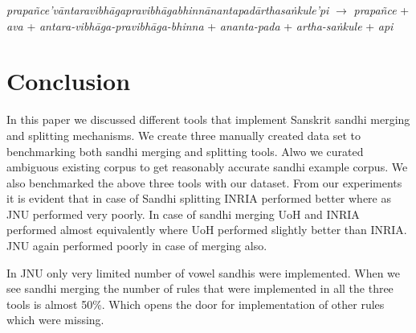 \documentclass[11pt]{article}
\begin{document}
\textit{prapa\~{n}ce'v\={a}ntaravibh\={a}gapravibh\={a}gabhinn\={a}nantapad\={a}rthasa\.{n}kule'pi} $\rightarrow$ \textit{prapa\~{n}ce} + \textit{ava} + \textit{antara-vibh\={a}ga-pravibh\={a}ga-bhinna} + \textit{ananta-pada} + \textit{artha-sa\.{n}kule} + \textit{api}


\section{Conclusion}
In this paper we discussed different tools that implement Sanskrit sandhi merging and splitting mechanisms. We create three manually created data set to benchmarking both sandhi merging and splitting tools. Alwo we curated ambiguous existing corpus to get reasonably accurate sandhi example corpus. 
We also benchmarked the above three tools with our dataset. From our experiments it is evident that in case of Sandhi splitting INRIA performed better where as JNU performed very poorly.  In case of sandhi merging UoH and INRIA performed almost equivalently where UoH performed slightly better than INRIA. JNU again performed poorly in case of merging also. 

In JNU only very limited number of vowel sandhis were implemented. When we see sandhi merging the number of rules that were implemented in all the three tools is almost 50\%. Which opens the door for implementation of other rules which were missing.
\end{document}
